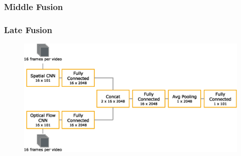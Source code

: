 
\subsubsection{Middle Fusion}


\subsubsection{Late Fusion}


\begin{figure}[!htb]
	\centering
	\includegraphics[scale=.7]{images/late_fusion.eps}
	\caption{}
	\label{fig:late_fusion}
\end{figure}